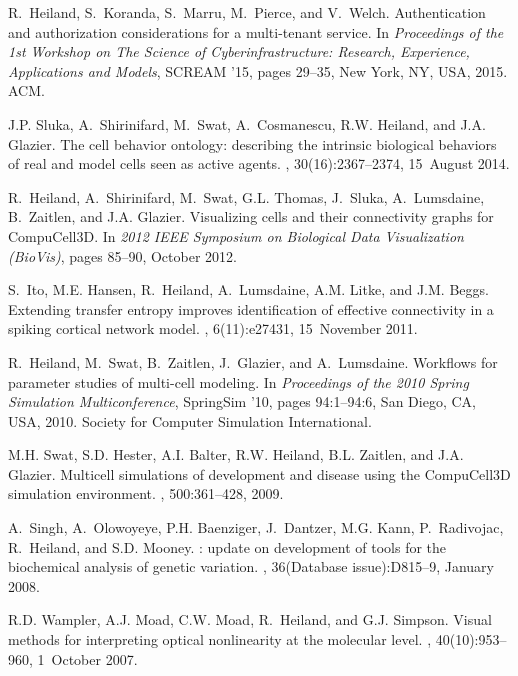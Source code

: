 \documentclass[letterpaper,11pt]{article}
\begin{document}
\begin{enumerate}
R.~Heiland, S.~Koranda, S.~Marru, M.~Pierce, and V.~Welch.
\newblock Authentication and authorization considerations for a multi-tenant
service.
\newblock In {\em Proceedings of the 1st Workshop on The Science of
	Cyberinfrastructure: Research, Experience, Applications and Models}, SCREAM
'15, pages 29--35, New York, NY, USA, 2015. ACM.

J.P. Sluka, A.~Shirinifard, M.~Swat, A.~Cosmanescu, R.W. Heiland, and J.A.
Glazier.
\newblock The cell behavior ontology: describing the intrinsic biological
behaviors of real and model cells seen as active agents.
, 30(16):2367--2374, 15~August 2014.

R.~Heiland, A.~Shirinifard, M.~Swat, G.L. Thomas, J.~Sluka, A.~Lumsdaine,
B.~Zaitlen, and J.A. Glazier.
\newblock Visualizing cells and their connectivity graphs for {CompuCell3D}.
\newblock In {\em 2012 {IEEE} Symposium on Biological Data Visualization
	({BioVis})}, pages 85--90, October 2012.

S.~Ito, M.E. Hansen, R.~Heiland, A.~Lumsdaine, A.M. Litke, and J.M. Beggs.
\newblock Extending transfer entropy improves identification of effective
connectivity in a spiking cortical network model.
, 6(11):e27431, 15~November 2011.

R.~Heiland, M.~Swat, B.~Zaitlen, J.~Glazier, and A.~Lumsdaine.
\newblock Workflows for parameter studies of multi-cell modeling.
\newblock In {\em Proceedings of the 2010 Spring Simulation Multiconference},
SpringSim '10, pages 94:1--94:6, San Diego, CA, USA, 2010. Society for
Computer Simulation International.

M.H. Swat, S.D. Hester, A.I. Balter, R.W. Heiland, B.L. Zaitlen, and J.A.
Glazier.
\newblock Multicell simulations of development and disease using the
{CompuCell3D} simulation environment.
, 500:361--428, 2009.

A.~Singh, A.~Olowoyeye, P.H. Baenziger, J.~Dantzer, M.G. Kann, P.~Radivojac,
R.~Heiland, and S.D. Mooney.
: update on development of tools for the biochemical analysis
of genetic variation.
, 36(Database issue):D815--9, January 2008.

R.D. Wampler, A.J. Moad, C.W. Moad, R.~Heiland, and G.J. Simpson.
\newblock Visual methods for interpreting optical nonlinearity at the molecular
level.
, 40(10):953--960, 1~October 2007.


\end{enumerate}
\end{document}
